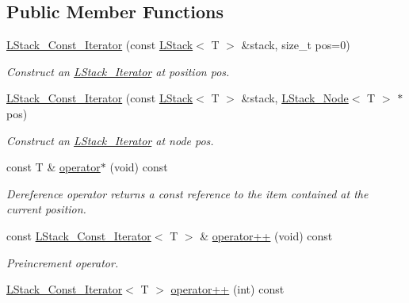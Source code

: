 \subsection*{Public Member Functions}
\begin{DoxyCompactItemize}
\item 
\hyperlink{classMadara_1_1Utility_1_1LStack__Const__Iterator_afc3edc92500b7052273b541c6b7add6b}{LStack\_\-Const\_\-Iterator} (const \hyperlink{classMadara_1_1Utility_1_1LStack}{LStack}$<$ T $>$ \&stack, size\_\-t pos=0)
\begin{DoxyCompactList}\small\item\em Construct an \hyperlink{classMadara_1_1Utility_1_1LStack__Iterator}{LStack\_\-Iterator} at position pos. \item\end{DoxyCompactList}\item 
\hyperlink{classMadara_1_1Utility_1_1LStack__Const__Iterator_a75fdea03d81756c961ef6537e196b5b0}{LStack\_\-Const\_\-Iterator} (const \hyperlink{classMadara_1_1Utility_1_1LStack}{LStack}$<$ T $>$ \&stack, \hyperlink{classMadara_1_1Utility_1_1LStack__Node}{LStack\_\-Node}$<$ T $>$ $\ast$pos)
\begin{DoxyCompactList}\small\item\em Construct an \hyperlink{classMadara_1_1Utility_1_1LStack__Iterator}{LStack\_\-Iterator} at node pos. \item\end{DoxyCompactList}\item 
const T \& \hyperlink{classMadara_1_1Utility_1_1LStack__Const__Iterator_aeb54d284d7e6f6045179ca1172f9ca2f}{operator$\ast$} (void) const 
\begin{DoxyCompactList}\small\item\em Dereference operator returns a const reference to the item contained at the current position. \item\end{DoxyCompactList}\item 
const \hyperlink{classMadara_1_1Utility_1_1LStack__Const__Iterator}{LStack\_\-Const\_\-Iterator}$<$ T $>$ \& \hyperlink{classMadara_1_1Utility_1_1LStack__Const__Iterator_a865ee0182dd03726265b2451fb531051}{operator++} (void) const 
\begin{DoxyCompactList}\small\item\em Preincrement operator. \item\end{DoxyCompactList}\item 
\hyperlink{classMadara_1_1Utility_1_1LStack__Const__Iterator}{LStack\_\-Const\_\-Iterator}$<$ T $>$ \hyperlink{classMadara_1_1Utility_1_1LStack__Const__Iterator_aab9251ba0a556395eb172b74d6a5e04c}{operator++} (int) const 

\end{DoxyCompactItemize}
